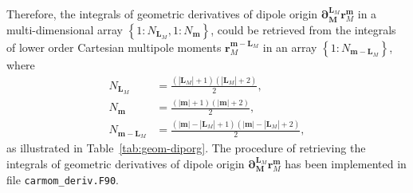 \documentclass[a4paper,11pt,twoside,openright]{book}
\begin{document}
Therefore, the integrals of geometric derivatives of dipole origin
$\boldsymbol{\partial}_{\boldsymbol{M}}^{\boldsymbol{L}_{M}}\boldsymbol{r}_{M}^{\boldsymbol{m}}$
in a multi-dimensional array $\left\{1\mathrm{:}N_{\boldsymbol{L}_{M}},1\mathrm{:}N_{\boldsymbol{m}}\right\}$,
could be retrieved from the integrals of lower order Cartesian multipole moments
$\boldsymbol{r}_{M}^{\boldsymbol{m}-\boldsymbol{L}_{M}}$ in an array
$\left\{1\mathrm{:}N_{\boldsymbol{m}-\boldsymbol{L}_{M}}\right\}$, where
\begin{align}
  N_{\boldsymbol{L}_{M}}%
    &=\frac{(|\boldsymbol{L}_{M}|+1)(|\boldsymbol{L}_{M}|+2)}{2},\\
  N_{\boldsymbol{m}}%
    &=\frac{(|\boldsymbol{m}|+1)(|\boldsymbol{m}|+2)}{2},\\
  N_{\boldsymbol{m}-\boldsymbol{L}_{M}}%
    &=\frac{(|\boldsymbol{m}|-|\boldsymbol{L}_{M}|+1)(|\boldsymbol{m}|-|\boldsymbol{L}_{M}|+2)}{2},
\end{align}
as illustrated in Table~\ref{tab:geom-diporg}. The procedure of retrieving the integrals of geometric
derivatives of dipole origin $\boldsymbol{\partial}_{\boldsymbol{M}}^{\boldsymbol{L}_{M}}\boldsymbol{r}_{M}^{\boldsymbol{m}}$
has been implemented in file \verb|carmom_deriv.F90|.
\end{document}
